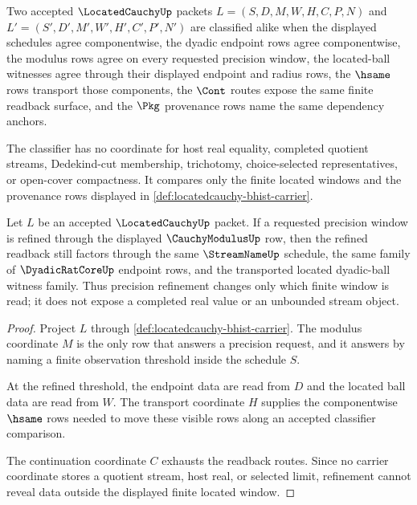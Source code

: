 \begin{definition}
\label{def:locatedcauchy-classifier}
Two accepted $\LocatedCauchyUp$ packets
$L=(S,D,M,W,H,C,P,N)$ and $L'=(S',D',M',W',H',C',P',N')$ are classified alike
when the displayed schedules agree componentwise, the dyadic endpoint rows
agree componentwise, the modulus rows agree on every requested precision
window, the located-ball witnesses agree through their displayed endpoint and
radius rows, the $\hsame$ rows transport those components, the $\Cont$ routes
expose the same finite readback surface, and the $\Pkg$ provenance rows name the
same dependency anchors.

The classifier has no coordinate for host real equality, completed quotient
streams, Dedekind-cut membership, trichotomy, choice-selected representatives,
or open-cover compactness. It compares only the finite located windows and the
provenance rows displayed in
\autoref{def:locatedcauchy-bhist-carrier}.
\end{definition}

\begin{theorem}
\label{thm:locatedcauchy-window-stability}
Let $L$ be an accepted $\LocatedCauchyUp$ packet. If a requested precision
window is refined through the displayed $\CauchyModulusUp$ row, then the refined
readback still factors through the same $\StreamNameUp$ schedule, the same
family of $\DyadicRatCoreUp$ endpoint rows, and the transported located
dyadic-ball witness family. Thus precision refinement changes only which finite
window is read; it does not expose a completed real value or an unbounded stream
object.
\end{theorem}
\begin{proof}
Project $L$ through \autoref{def:locatedcauchy-bhist-carrier}. The modulus
coordinate $M$ is the only row that answers a precision request, and it answers
by naming a finite observation threshold inside the schedule $S$.

At the refined threshold, the endpoint data are read from $D$ and the located
ball data are read from $W$. The transport coordinate $H$ supplies the
componentwise $\hsame$ rows needed to move these visible rows along an accepted
classifier comparison.

The continuation coordinate $C$ exhausts the readback routes. Since no carrier
coordinate stores a quotient stream, host real, or selected limit, refinement
cannot reveal data outside the displayed finite located window.
\end{proof}

